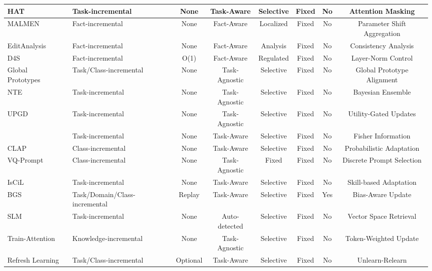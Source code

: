 \begin{table}[t]
{\begin{tabular}{@{}l p{3cm} c c c c c c@{}}
HAT~\citep{serra2018overcoming} & Task-incremental & None & Task-Aware & Selective & Fixed & No & Attention Masking \\ \midrule
MALMEN~\citep{tan2023massive} & Fact-incremental & None & Fact-Aware & Localized & Fixed & No & Parameter Shift Aggregation \\
EditAnalysis~\citep{li2023unveiling} & Fact-incremental & None & Fact-Aware & Analysis & Fixed & No & Consistency Analysis \\
D4S~\citep{huang2024reasons} & Fact-incremental & O(1) & Fact-Aware & Regulated & Fixed & No & Layer-Norm Control \\ \midrule
Global Prototypes~\citep{baicontinual} & Task/Class-incremental & None & Task-Agnostic & Selective & Fixed & No & Global Prototype Alignment \\
NTE~\citep{benjamin2024continual} & Task-incremental & None & Task-Agnostic & Selective & Fixed & No & Bayesian Ensemble \\
UPGD~\citep{elsayed2024addressing} & Task-incremental & None & Task-Agnostic & Selective & Fixed & No & Utility-Gated Updates \\
~\citep{hiratani2024disentangling} & Task-incremental & None & Task-Aware & Selective & Fixed & No & Fisher Information \\
CLAP~\citep{jha2024clap4clip} & Class-incremental & None & Task-Aware & Selective & Fixed & No & Probabilistic Adaptation \\
VQ-Prompt~\citep{jiao2024vector} & Class-incremental & None & Task-Agnostic & Fixed & Fixed & No & Discrete Prompt Selection \\
IsCiL~\citep{lee2024incremental} & Task-incremental & None & Task-Aware & Selective & Fixed & No & Skill-based Adaptation \\
BGS~\citep{leecontinual} & Task/Domain/Class-incremental & Replay & Task-Aware & Selective & Fixed & Yes & Bias-Aware Update \\
SLM~\citep{peng2024scalable} & Task-incremental & None & Auto-detected & Selective & Fixed & No & Vector Space Retrieval \\
Train-Attention~\citep{seo2024train} & Knowledge-incremental & None & Task-Agnostic & Selective & Fixed & No & Token-Weighted Update \\
Refresh Learning~\citep{wang2024unified} & Task/Class-incremental & Optional & Task-Aware & Selective & Fixed & No & Unlearn-Relearn \\

\end{tabular}}
\end{table}
